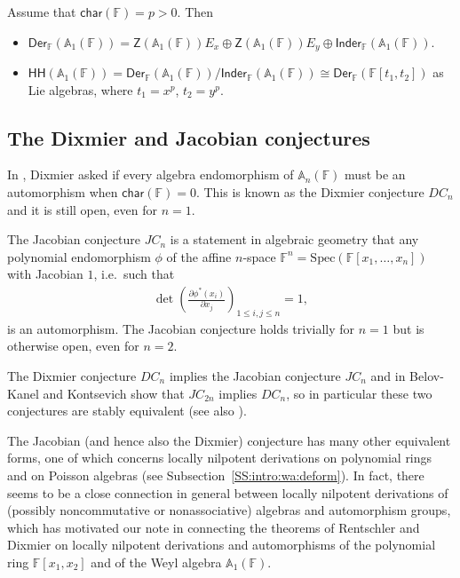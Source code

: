 \documentclass{commat}
\newcommand{\FF}{\mathbb{F}}
\newcommand{\wa}[1][1]{\mathbb{A}_{#1}}
\newcommand\chara{\mathsf {char}}
\newcommand\inder{ \mathsf {Inder_\FF}}
\newcommand\der[1][\FF]{ \mathsf{Der}_{#1}}
\newcommand\hoch{\mathsf{HH}}
\newcommand{\seq}[1]{\left( #1\right)}
\begin{document}
\begin{theorem}  Assume that $\chara(\FF) = p > 0$. 
	Then 
	\begin{itemize}
		\item[{\rm (a)}]  $\der(\wa(\FF)) =\mathsf{Z}(\wa(\FF)) E_x \oplus \mathsf{Z}(\wa(\FF)) E_y \oplus  \inder(\wa(\FF))$.
		\item[{\rm (b)}]  $\hoch(\wa(\FF)) =  \der(\wa(\FF))/\inder(\wa(\FF)) \cong \der(\FF[t_1, t_2])$ as Lie algebras, where $t_1 = x^p$, $t_2 = y^p$.  
	\end{itemize}  
\end{theorem} 

\subsection{The Dixmier and Jacobian conjectures}\label{SS:intro:wa:djc}

In \cite[Problem 1]{jD68}, Dixmier asked if every algebra endomorphism of $\wa[n](\FF)$ must be an automorphism when $\chara(\FF) = 0$. This is known as the Dixmier conjecture $DC_n$ and it is still open, even for $n=1$.

The Jacobian conjecture $JC_n$ is a statement in algebraic geometry that any polynomial endomorphism $\phi$ of the affine $n$-space $\FF^n=\mathrm{Spec} (\FF[x_1,\ldots, x_n])$ with Jacobian $1$, i.e.\ such that
\begin{align*}
	\det\seq{\frac{\partial \phi^*(x_i)}{\partial x_j}}_{1\leq i,j\leq n}=1,
\end{align*}
is an automorphism. The Jacobian conjecture holds trivially for $n=1$ but is otherwise open, even for $n=2$. 

The Dixmier conjecture $DC_n$ implies the Jacobian conjecture $JC_n$ and in \cite{BKK07} Belov-Kanel and Kontsevich show that $JC_{2n}$ implies $DC_n$, so in particular these two conjectures are stably equivalent (see also \cite{yT05}).

The Jacobian (and hence also the Dixmier) conjecture has many other equivalent forms, one of which concerns locally nilpotent derivations on polynomial rings and on Poisson algebras (see Subsection~\ref{SS:intro:wa:deform}). In fact, there seems to be a close connection in general between locally nilpotent derivations of (possibly noncommutative or nonassociative) algebras and automorphism groups, which has motivated our note in \cite{KLM21} connecting the theorems of Rentschler \cite{rR68} and Dixmier \cite{jD68} on locally nilpotent derivations and automorphisms of the polynomial ring $\FF[x_1, x_2]$ and of the Weyl algebra $\wa(\FF)$.
\end{document}
